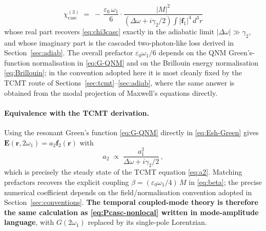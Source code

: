 \documentclass[11pt,a4paper]{article}
\newcommand{\eps}{\varepsilon}
\newcommand{\bvec}[1]{\mathbf{#1}}
\newcommand{\f}{\bvec{f}}
\newcommand{\ri}{\bvec{r}}
\newcommand{\dthreer}{\,d^{3}r}
\newcommand{\chithree}{\chi^{(3)}}
\newcommand{\Dom}{\Delta\omega}
\begin{document}
\begin{itemize}
\begin{equation}
      \boxed{\;\chithree_{\text{casc}}\;=\;
        -\,\frac{\eps_0\,\omega_1}{6}\cdot
        \frac{|M|^2}{(\Dom+i\gamma_2/2)\!\int\!|\f_1|^4\dthreer}\;}
      \label{eq:chi3casc-tensor}
    \end{equation}
    whose real part recovers \eqref{eq:chi3casc} exactly in the
    adiabatic limit $|\Dom|\gg\gamma_2$, and whose imaginary part is
    the cascaded two-photon-like loss derived in
    Section~\ref{sec:adiab}.  The overall prefactor $\eps_0\omega_1/6$
    depends on the QNM Green's-function normalisation in \eqref{eq:G-QNM}
    and on the Brillouin energy normalisation \eqref{eq:Brillouin};
    in the convention adopted here it is most cleanly fixed by the
    TCMT route of Sections~\ref{sec:tcmt}--\ref{sec:adiab}, where the
    same answer is obtained from the modal projection of Maxwell's
    equations directly.
\end{itemize}

\paragraph{Equivalence with the TCMT derivation.}
Using the resonant Green's function \eqref{eq:G-QNM} directly in
\eqref{eq:Esh-Green} gives $\mathbf E(\ri,2\omega_1)=a_2\f_2(\ri)$
with
\begin{equation}
  a_2\;\propto\;\frac{a_1^2}{\Dom+i\gamma_2/2}\,,
\end{equation}
which is precisely the steady state of the TCMT equation
\eqref{eq:a2}.  Matching prefactors recovers the explicit coupling
$\beta=(\eps_0\omega_1/4)\,M$ in \eqref{eq:beta}; the precise numerical
coefficient depends on the field/normalisation convention adopted in
Section~\ref{sec:conventions}.  \textbf{The temporal coupled-mode
theory is therefore the same calculation as \eqref{eq:Pcasc-nonlocal}
written in mode-amplitude language}, with $G(2\omega_1)$ replaced by
its single-pole Lorentzian.
\end{document}
